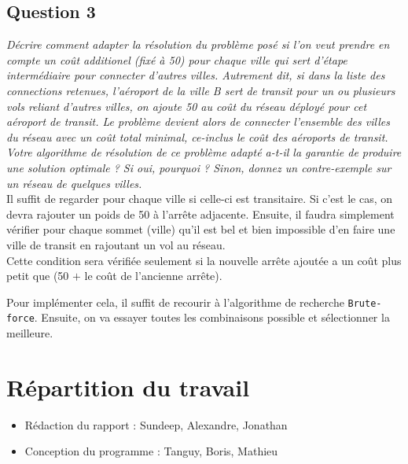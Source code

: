 \documentclass[11pt]{article}
\begin{document}
\subsection*{Question 3}
\textit{Décrire comment adapter la résolution du problème posé si l’on veut prendre en compte un coût additionel (fixé à 50) pour chaque ville qui sert d’étape intermédiaire pour connecter d’autres villes. Autrement dit, si dans la liste des connections retenues, l’aéroport de la ville B sert de transit pour un ou plusieurs vols reliant d’autres villes, on ajoute 50 au coût du réseau déployé pour cet aéroport de transit. Le problème devient alors de connecter l’ensemble des villes du réseau avec un coût total minimal, ce-inclus le coût des aéroports de transit. Votre algorithme de résolution de ce problème adapté a-t-il la garantie de produire une solution optimale ? Si oui, pourquoi ? Sinon, donnez un contre-exemple sur un réseau de quelques villes.} \\ 

Il suffit de regarder pour chaque ville si celle-ci est transitaire. Si c'est le cas, on devra rajouter un poids de 50 à l'arrête adjacente. Ensuite, il faudra simplement vérifier pour chaque sommet (ville) qu'il est bel et bien impossible d'en faire une ville de transit en rajoutant un vol au réseau. \\
Cette condition sera vérifiée seulement si la nouvelle arrête ajoutée a un coût plus petit que (50 $+$ le coût de l'ancienne arrête).

Pour implémenter cela, il suffit de recourir à l'algorithme de recherche \verb+Brute-force+. Ensuite, on va essayer toutes les combinaisons possible et sélectionner la meilleure.



\section{Répartition du travail}
\begin{itemize}
\item Rédaction du rapport : Sundeep, Alexandre, Jonathan
\item Conception du programme : Tanguy, Boris, Mathieu
\end{itemize}
\end{document}
